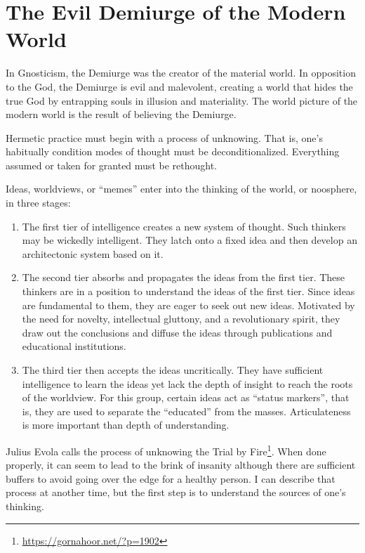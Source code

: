 \section{The Evil Demiurge of the Modern World}

In Gnosticism, the Demiurge was the creator of the material world. In opposition to the God, the Demiurge is evil and malevolent, creating a world that hides the true God by entrapping souls in illusion and materiality. The world picture of the modern world is the result of believing the Demiurge.

Hermetic practice must begin with a process of unknowing. That is, one's habitually condition modes of thought must be deconditionalized. Everything assumed or taken for granted must be rethought.

Ideas, worldviews, or ``memes'' enter into the thinking of the world, or noosphere, in three stages:

\begin{enumerate}


\item The first tier of intelligence creates a new system of thought. Such thinkers may be wickedly intelligent. They latch onto a fixed idea and then develop an architectonic system based on it.

\item The second tier absorbs and propagates the ideas from the first tier. These thinkers are in a position to understand the ideas of the first tier. Since ideas are fundamental to them, they are eager to seek out new ideas. Motivated by the need for novelty, intellectual gluttony, and a revolutionary spirit, they draw out the conclusions and diffuse the ideas through publications and educational institutions.

\item The third tier then accepts the ideas uncritically. They have sufficient intelligence to learn the ideas yet lack the depth of insight to reach the roots of the worldview. For this group, certain ideas act as ``status markers'', that is, they are used to separate the ``educated'' from the masses. Articulateness is more important than depth of understanding.
\end{enumerate}


Julius Evola calls the process of unknowing the Trial by Fire\footnote{\url{https://gornahoor.net/?p=1902}}. When done properly, it can seem to lead to the brink of insanity although there are sufficient buffers to avoid going over the edge for a healthy person. I can describe that process at another time, but the first step is to understand the sources of one's thinking.

